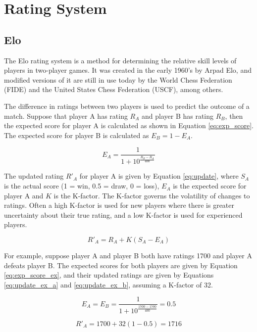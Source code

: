 \section{Rating System}


\subsection{Elo}
\label{sec:elo}
The Elo rating system is a method for determining the relative skill levels of players in two-player games.
It was created in the early 1960's by Arpad Elo, and modified versions of it are still in use today by the World Chess Federation (FIDE) and the United States Chess Federation (USCF), among others.

The difference in ratings between two players is used to predict the outcome of a match.
Suppose that player A has rating $R_A$ and player B has rating $R_B$, then the expected score for player A is calculated as shown in Equation \ref{eq:exp_score}.
The expected score for player B is calculated as $E_B = 1 - E_A$.

\begin{equation} \label{eq:exp_score}
E_A = \frac{1}{1 + 10^\frac{R_B - R_A}{400}}
\end{equation}

The updated rating $R'_A$ for player A is given by Equation \ref{eq:update}, where $S_A$ is the actual score (1 = win, 0.5 = draw, 0 = loss), $E_A$ is the expected score for player A and $K$ is the K-factor.
The K-factor governs the volatility of changes to ratings.
Often a high K-factor is used for new players where there is greater uncertainty about their true rating, and a low K-factor is used for experienced players.

\begin{equation} \label{eq:update}
R'_A = R_A + K \left( S_A - E_A \right)
\end{equation}

For example, suppose player A and player B both have ratings 1700 and player A defeats player B.
The expected scores for both players are given by Equation \ref{eq:exp_score_ex}, and their updated ratings are given by Equations \ref{eq:update_ex_a} and \ref{eq:update_ex_b}, assuming a K-factor of 32.

\begin{equation} \label{eq:exp_score_ex}
E_A = E_B = \frac{1}{1 + 10^\frac{1700 - 1700}{400}} = 0.5
\end{equation}

\begin{equation} \label{eq:update_ex_a}
R'_A = 1700 + 32 \left( 1 - 0.5 \right) = 1716
\end{equation}

